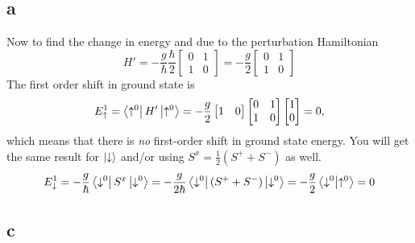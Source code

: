 \documentclass[11pt]{amsart}
\begin{document}
\subsection*{a}

Now to find the change in energy and due to the perturbation Hamiltonian
\begin{equation}
H' = -\frac{g}{\hbar}\frac{\hbar}{2}
\begin{bmatrix}
0 & 1 \\
1 & 0
\end{bmatrix}
= -\frac{g}{2}
\begin{bmatrix}
0 & 1 \\
1 & 0
\end{bmatrix}
\end{equation}
The first order shift in ground state is 
\begin{equation}
E_\uparrow^1 = \bra{\uparrow^0} H'\ket{\uparrow^0} = -\frac{g}{2} 
\begin{bmatrix}
1 & 0
\end{bmatrix}
\begin{bmatrix}
0 & 1 \\
1 & 0
\end{bmatrix}
\begin{bmatrix}
1 \\ 0 
\end{bmatrix}=0,
\end{equation}
which means that there is \emph{no} first-order shift in ground state energy. You will get the same result for $\ket{\downarrow}$ and/or using $S^x = \frac{1}{2}(S^+ + S^-)$ as well.
\begin{equation}
E_\downarrow^1 = -\frac{g}{\hbar}\bra{\downarrow^0}S^x\ket{\downarrow^0} = -\frac{g}{2\hbar}\bra{\downarrow^0} (S^+ + S^-) \ket{\downarrow^0} = -\frac{g}{2} \bra{\downarrow^0} \ket{\uparrow^0} = 0
\end{equation}

\subsection*{c}
\end{document}
